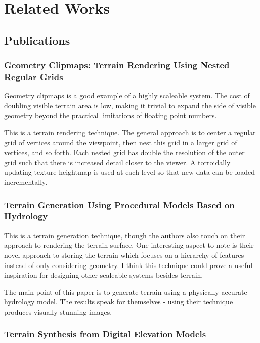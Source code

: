 
\chapter{Related Works}

\section{Publications}

\subsection{Geometry Clipmaps: Terrain Rendering Using Nested Regular Grids}

Geometry clipmaps is a good example of a highly scaleable system. The cost of doubling visible terrain area is low, making it trivial to expand the side of visible geometry beyond the practical limitations of floating point numbers. \cite{geometry_clipmaps}

This is a terrain rendering technique.
The general approach is to center a regular grid of vertices around the viewpoint, then nest this grid in a larger grid of vertices, and so forth.
Each nested grid has double the resolution of the outer grid such that there is increased detail closer to the viewer.
A torroidally updating texture heightmap is used at each level so that new data can be loaded incrementally.

\subsection{Terrain Generation Using Procedural Models Based on Hydrology}

This is a terrain generation technique, though the authors also touch on their approach to rendering the terrain surface.
One interesting aspect to note is their novel approach to storing the terrain which focuses on a hierarchy of features instead of only considering geometry.
I think this technique could prove a useful inspiration for designing other scaleable systems besides terrain.

The main point of this paper is to generate terrain using a physically accurate hydrology model.
The results speak for themselves - using their technique produces visually stunning images.

\subsection{Terrain Synthesis from Digital Elevation Models}

